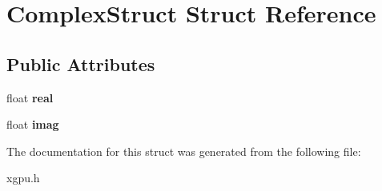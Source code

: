 \hypertarget{struct_complex_struct}{}\section{Complex\+Struct Struct Reference}
\label{struct_complex_struct}
\subsection*{Public Attributes}
\begin{DoxyCompactItemize}
\item 
float {\bfseries real}\hypertarget{struct_complex_struct_a53ef20db23ac921365f71e6e5575e9eb}{}\label{struct_complex_struct_a53ef20db23ac921365f71e6e5575e9eb}

\item 
float {\bfseries imag}\hypertarget{struct_complex_struct_adb22bfd1730ea7747317740c1f21c51b}{}\label{struct_complex_struct_adb22bfd1730ea7747317740c1f21c51b}

\end{DoxyCompactItemize}


The documentation for this struct was generated from the following file\+:\begin{DoxyCompactItemize}
\item 
xgpu.\+h\end{DoxyCompactItemize}
